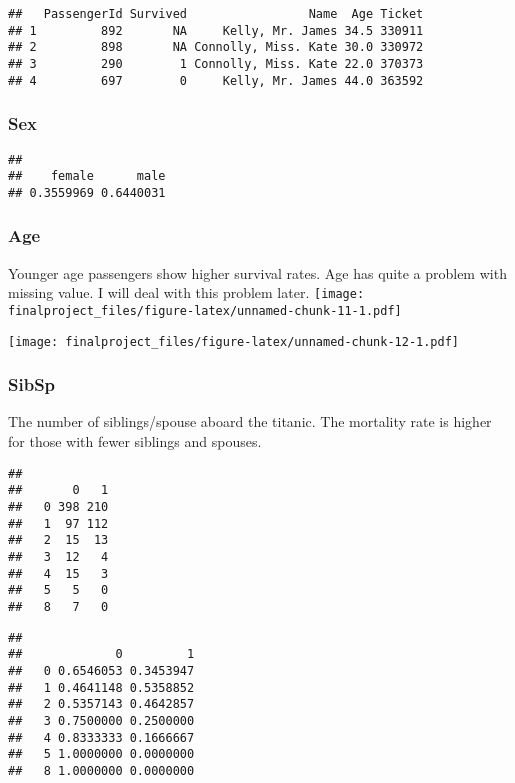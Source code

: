 \documentclass[
]{article}
\begin{document}
\begin{verbatim}
##   PassengerId Survived                 Name  Age Ticket
## 1         892       NA     Kelly, Mr. James 34.5 330911
## 2         898       NA Connolly, Miss. Kate 30.0 330972
## 3         290        1 Connolly, Miss. Kate 22.0 370373
## 4         697        0     Kelly, Mr. James 44.0 363592
\end{verbatim}

\hypertarget{sex}{%
\subsubsection{\texorpdfstring{\textbf{Sex}}{Sex}}\label{sex}}

\begin{verbatim}
## 
##    female      male 
## 0.3559969 0.6440031
\end{verbatim}

\hypertarget{age}{%
\subsubsection{\texorpdfstring{\textbf{Age}}{Age}}\label{age}}

Younger age passengers show higher survival rates. Age has quite a
problem with missing value. I will deal with this problem later.
\texttt{[image: finalproject\_files/figure-latex/unnamed-chunk-11-1.pdf]}

\texttt{[image: finalproject\_files/figure-latex/unnamed-chunk-12-1.pdf]}

\hypertarget{sibsp}{%
\subsubsection{\texorpdfstring{\textbf{SibSp}}{SibSp}}\label{sibsp}}

The number of siblings/spouse aboard the titanic. The mortality rate is
higher for those with fewer siblings and spouses.

\begin{verbatim}
##    
##       0   1
##   0 398 210
##   1  97 112
##   2  15  13
##   3  12   4
##   4  15   3
##   5   5   0
##   8   7   0
\end{verbatim}

\begin{verbatim}
##    
##             0         1
##   0 0.6546053 0.3453947
##   1 0.4641148 0.5358852
##   2 0.5357143 0.4642857
##   3 0.7500000 0.2500000
##   4 0.8333333 0.1666667
##   5 1.0000000 0.0000000
##   8 1.0000000 0.0000000
\end{verbatim}
\end{document}
